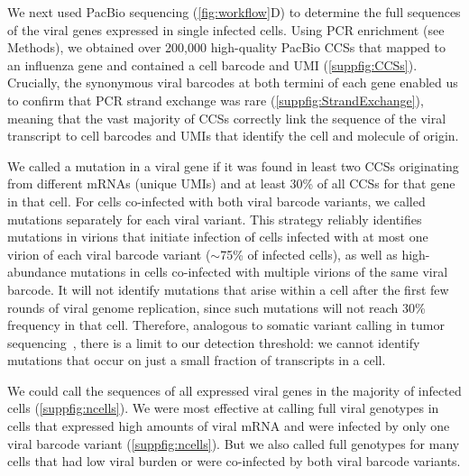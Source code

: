 \documentclass[10pt,letterpaper]{article}
\newcommand{\FIG}[1]{\autoref{fig:#1}}
\newcommand{\SUPPFIG}[1]{\autoref{suppfig:#1}}
\begin{document}
We next used PacBio sequencing (\FIG{workflow}D) to determine the full sequences of the viral genes expressed in single infected cells.
Using PCR enrichment (see Methods), we obtained over 200,000 high-quality PacBio CCSs that mapped to an influenza gene and contained a cell barcode and UMI (\SUPPFIG{CCSs}).
Crucially, the synonymous viral barcodes at both termini of each gene enabled us to confirm that PCR strand exchange was rare (\SUPPFIG{StrandExchange}), meaning that the vast majority of CCSs correctly link the sequence of the viral transcript to cell barcodes and UMIs that identify the cell and molecule of origin.

We called a mutation in a viral gene if it was found in least two CCSs originating from different mRNAs (unique UMIs) and at least 30\% of all CCSs for that gene in that cell.
For cells co-infected with both viral barcode variants, we called mutations separately for each viral variant.
This strategy reliably identifies mutations in virions that initiate infection of cells infected with at most one virion of each viral barcode variant ($\sim$75\% of infected cells), as well as high-abundance mutations in cells co-infected with multiple virions of the same viral barcode.
It will not identify mutations that arise within a cell after the first few rounds of viral genome replication, since such mutations will not reach 30\% frequency in that cell.
Therefore, analogous to somatic variant calling in tumor sequencing~\cite{xu2014comparison, cibulskis2013sensitive}, there is a limit to our detection threshold: we cannot identify mutations that occur on just a small fraction of transcripts in a cell. 

We could call the sequences of all expressed viral genes in the majority of infected cells (\SUPPFIG{ncells}).
We were most effective at calling full viral genotypes in cells that expressed high amounts of viral mRNA and were infected by only one viral barcode variant (\SUPPFIG{ncells}).
But we also called full genotypes for many cells that had low viral burden or were co-infected by both viral barcode variants.
\end{document}
